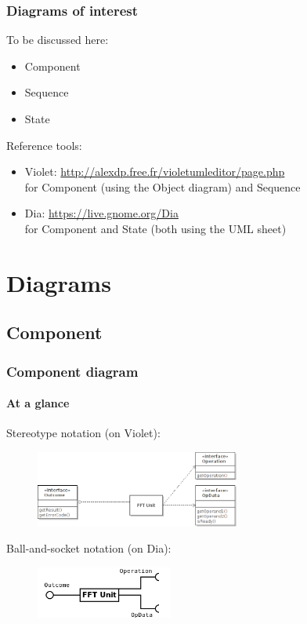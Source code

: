 \begin{frame}
\frametitle{Diagrams of interest}

\begin{block}{To be discussed here:}
\begin{itemize}
\item Component
\item Sequence
\item State
\end{itemize}
\end{block}

\begin{block}{Reference tools:}
\begin{itemize}
\item Violet: \url{http://alexdp.free.fr/violetumleditor/page.php}
\\ for Component (using the Object diagram) and Sequence
\item Dia: \url{https://live.gnome.org/Dia}
\\ for Component and State (both using the UML sheet)
\end{itemize}
\end{block}

\end{frame}

\section{Diagrams}

\subsection{Component}

\begin{frame}
\frametitle{Component diagram}
\framesubtitle{At a glance}

Stereotype notation (on Violet):
\begin{figure}
\includegraphics[width=0.6\textwidth]{lecture02/img/stereotype_components.png}
\end{figure}
Ball-and-socket notation (on Dia):
\begin{figure}
\includegraphics[width=0.4\textwidth]{lecture02/img/ballsocket_components.png}
\end{figure}


\end{frame}

